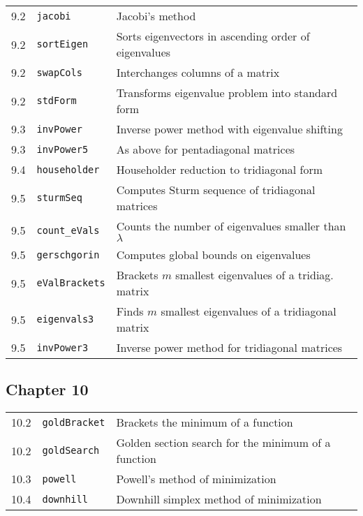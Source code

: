 \begin{tabular}{lll}
9.2 & \texttt{jacobi} & Jacobi's method \\ 
9.2 & \texttt{sortEigen} & Sorts eigenvectors in ascending order of
eigenvalues \\ 
9.2 & \texttt{swapCols} & Interchanges columns of a matrix \\ 
9.2 & \texttt{stdForm} & Transforms eigenvalue problem into standard form \\ 
9.3 & \texttt{invPower} & Inverse power method with eigenvalue shifting \\ 
9.3 & \texttt{invPower5} & As above for pentadiagonal matrices \\ 
9.4 & \texttt{householder} & Householder reduction to tridiagonal form \\ 
9.5 & \texttt{sturmSeq} & Computes Sturm sequence of tridiagonal matrices \\ 
9.5 & \texttt{count\_eVals} & Counts the number of eigenvalues smaller than $%
\lambda $ \\ 
9.5 & \texttt{gerschgorin} & Computes global bounds on eigenvalues \\ 
9.5 & \texttt{eValBrackets} & Brackets $m$ smallest eigenvalues of a
tridiag. matrix \\ 
9.5 & \texttt{eigenvals3} & Finds $m$ smallest eigenvalues of a tridiagonal
matrix \\ 
9.5 & \texttt{invPower3} & Inverse power method for tridiagonal matrices%
\end{tabular}

\subsection{Chapter 10}

\begin{tabular}{lll}
10.2 & \texttt{goldBracket} & Brackets the minimum of a function \\ 
10.2 & \texttt{goldSearch} & Golden section search for the minimum of a
function \\ 
10.3 & \texttt{powell} & Powell's method of minimization \\ 
10.4 & \texttt{downhill} & Downhill simplex method of minimization%
\end{tabular}
